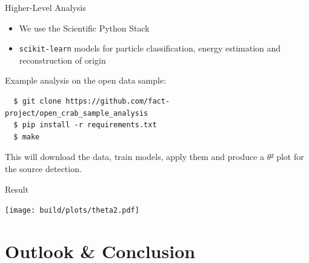 \documentclass[compress, 9pt, aspectratio=1610, professionalfonts]{beamer}
\begin{document}
\begin{frame}[c, fragile]{Higher-Level Analysis}
  \begin{itemize}
    \item We use the Scientific Python Stack
    \item \texttt{scikit-learn} models for particle classification, energy estimation and reconstruction of origin
  \end{itemize}

  \vspace{0.25cm}
  
  Example analysis on the open data sample:

  \begin{verbatim}
  $ git clone https://github.com/fact-project/open_crab_sample_analysis
  $ pip install -r requirements.txt
  $ make
  \end{verbatim}

  This will download the data, train models, apply them and produce a $θ²$ plot for the source detection.

\end{frame}

\begin{frame}[t]{Result}
  \begin{center}
    \texttt{[image: build/plots/theta2.pdf]}
  \end{center}
\end{frame}

\section{Outlook \& Conclusion}
\end{document}
